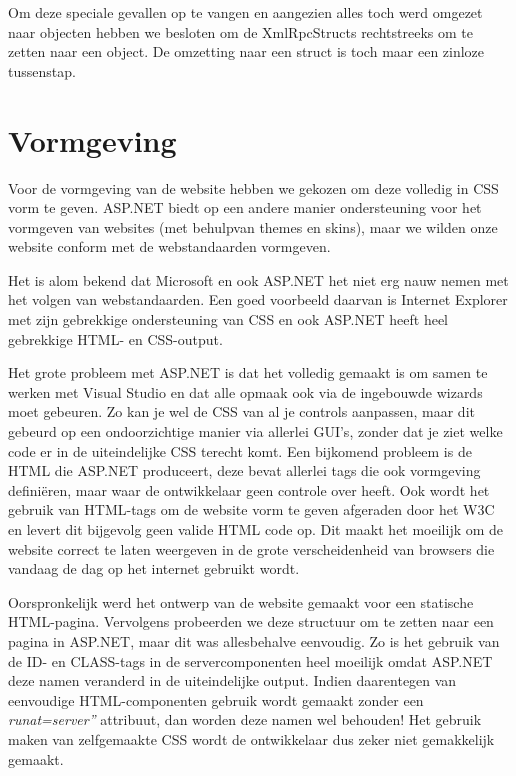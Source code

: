 Om deze speciale gevallen op te vangen en aangezien alles toch werd omgezet naar objecten hebben we besloten om de XmlRpcStructs rechtstreeks om te zetten naar een object. De omzetting naar een struct is toch maar een zinloze tussenstap.

\section{Vormgeving}

Voor de vormgeving van de website hebben we gekozen om deze volledig in CSS vorm te geven. ASP.NET biedt op een andere manier ondersteuning voor het vormgeven van websites (met behulpvan themes en skins), maar we wilden onze website conform met de webstandaarden vormgeven.

Het is alom bekend dat Microsoft en ook ASP.NET het niet erg nauw nemen met het volgen van webstandaarden. Een goed voorbeeld daarvan is Internet Explorer met zijn gebrekkige ondersteuning van CSS en ook ASP.NET heeft heel gebrekkige HTML- en CSS-output.

Het grote probleem met ASP.NET is dat het volledig gemaakt is om samen te werken met Visual Studio en dat alle opmaak ook via de ingebouwde wizards moet gebeuren. Zo kan je wel de CSS van al je controls aanpassen, maar dit gebeurd op een ondoorzichtige manier via allerlei GUI's, zonder dat je ziet welke code er in de uiteindelijke CSS terecht komt. Een bijkomend probleem is de HTML die ASP.NET produceert, deze bevat allerlei tags die ook vormgeving defini\"eren, maar waar de ontwikkelaar geen controle over heeft. Ook wordt het gebruik van HTML-tags om de website vorm te geven afgeraden door het W3C en levert dit bijgevolg geen valide HTML code op. Dit maakt het moeilijk om de website correct te laten weergeven in de grote verscheidenheid van browsers die vandaag de dag op het internet gebruikt wordt.

Oorspronkelijk werd het ontwerp van de website gemaakt voor een statische HTML-pagina. Vervolgens probeerden we deze structuur om te zetten naar een pagina in ASP.NET, maar dit was allesbehalve eenvoudig. Zo is het gebruik van de ID- en CLASS-tags in de servercomponenten heel moeilijk omdat ASP.NET deze namen veranderd in de uiteindelijke output. Indien daarentegen van eenvoudige HTML-componenten gebruik wordt gemaakt zonder een \emph{runat=server''} attribuut, dan worden deze namen wel behouden! Het gebruik maken van zelfgemaakte CSS wordt de ontwikkelaar dus zeker niet gemakkelijk gemaakt.

